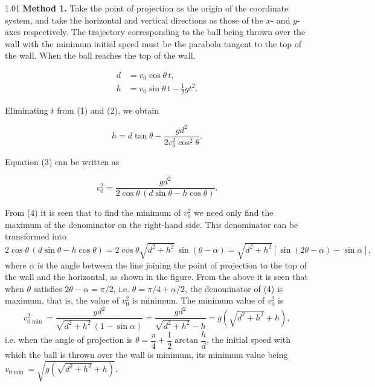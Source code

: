 \begin{solution}{1.01}
\textbf{Method 1.} Take the point of projection as the origin of the coordinate system, and
take the horizontal and vertical directions as those of the $x$- and $y$-axes respectively.
The trajectory corresponding to the ball being thrown over the wall with the minimum initial
speed must be the parabola tangent to the top of the wall. When the ball reaches the top of
the wall,

\begin{align}
d &= v_0\cos\theta\, t, \tag{1}\\
h &= v_0\sin\theta\, t - \frac{1}{2}gt^2. \tag{2}
\end{align}

Eliminating $t$ from (1) and (2), we obtain

\begin{equation}
h = d\tan\theta - \frac{gd^2}{2v_0^2\cos^2\theta}. \tag{3}
\end{equation}

Equation (3) can be written as

\begin{equation}
v_0^2 = \frac{gd^2}{2\cos\theta\,(d\sin\theta - h\cos\theta)}. \tag{4}
\end{equation}

From (4) it is seen that to find the minimum of $v_0^2$ we need only find the maximum of the
denominator on the right-hand side. This denominator can be transformed into
\begin{equation*}
2\cos\theta\,(d\sin\theta-h\cos\theta)
= 2\cos\theta\sqrt{d^2+h^2}\,\sin(\theta-\alpha)
= \sqrt{d^2+h^2}\left[\sin(2\theta-\alpha)-\sin\alpha\right],
\end{equation*}
where $\alpha$ is the angle between the line joining the point of projection to the top of the
wall and the horizontal, as shown in the figure. From the above it is seen that when $\theta$
satisfies $2\theta-\alpha=\pi/2$, i.e. $\theta=\pi/4+\alpha/2$, the denominator of (4) is
maximum, that is, the value of $v_0^2$ is minimum. The minimum value of $v_0^2$ is
\begin{equation*}
v_{0\min}^2
= \frac{gd^2}{\sqrt{d^2+h^2}\,(1-\sin\alpha)}
= \frac{gd^2}{\sqrt{d^2+h^2}-h}
= g\left(\sqrt{d^2+h^2}+h\right),
\end{equation*}
i.e. when the angle of projection is $\theta=\dfrac{\pi}{4}+\dfrac{1}{2}\arctan\dfrac{h}{d}$,
the initial speed with which the ball is thrown over the wall is minimum, its minimum value
being $v_{0\min}=\sqrt{g\left(\sqrt{d^2+h^2}+h\right)}$.


\end{solution}
